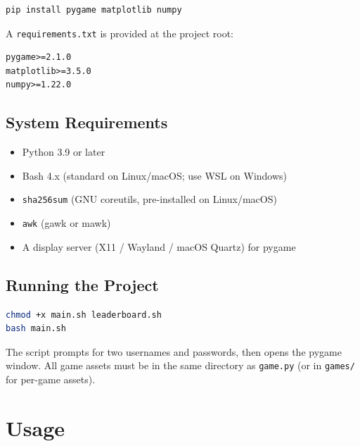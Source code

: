 \documentclass[12pt,a4paper]{article}
\begin{document}
\begin{lstlisting}[language=bash, caption={Installing Python dependencies}]
pip install pygame matplotlib numpy
\end{lstlisting}
 
A \texttt{requirements.txt} is provided at the project root:
 
\begin{lstlisting}[caption={requirements.txt}]
pygame>=2.1.0
matplotlib>=3.5.0
numpy>=1.22.0
\end{lstlisting}
 
\subsection{System Requirements}
 
\begin{itemize}[leftmargin=*]
  \item Python 3.9 or later
  \item Bash 4.x (standard on Linux/macOS; use WSL on Windows)
  \item \texttt{sha256sum} (GNU coreutils, pre-installed on Linux/macOS)
  \item \texttt{awk} (gawk or mawk)
  \item A display server (X11 / Wayland / macOS Quartz) for pygame
\end{itemize}
 
\subsection{Running the Project}
 
\begin{lstlisting}[language=bash, caption={Launching the game}]
chmod +x main.sh leaderboard.sh
bash main.sh
\end{lstlisting}
 
The script prompts for two usernames and passwords, then opens the pygame
window. All game assets must be in the same directory as \texttt{game.py} (or
in \texttt{games/} for per-game assets).
 

 

\section{Usage}
\end{document}
